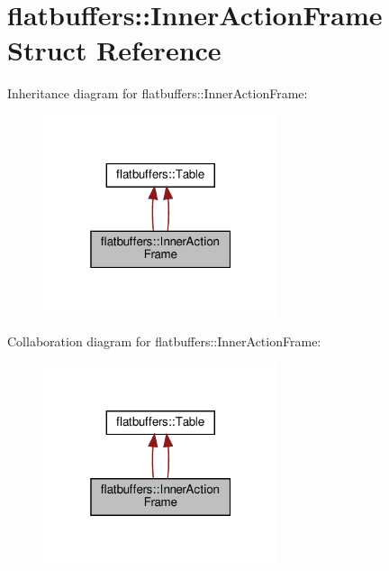 \hypertarget{structflatbuffers_1_1InnerActionFrame}{}\section{flatbuffers\+:\+:Inner\+Action\+Frame Struct Reference}
\label{structflatbuffers_1_1InnerActionFrame}


Inheritance diagram for flatbuffers\+:\+:Inner\+Action\+Frame\+:
\nopagebreak
\begin{figure}[H]
\begin{center}
\leavevmode
\includegraphics[width=196pt]{structflatbuffers_1_1InnerActionFrame__inherit__graph}
\end{center}
\end{figure}


Collaboration diagram for flatbuffers\+:\+:Inner\+Action\+Frame\+:
\nopagebreak
\begin{figure}[H]
\begin{center}
\leavevmode
\includegraphics[width=196pt]{structflatbuffers_1_1InnerActionFrame__coll__graph}
\end{center}
\end{figure}
